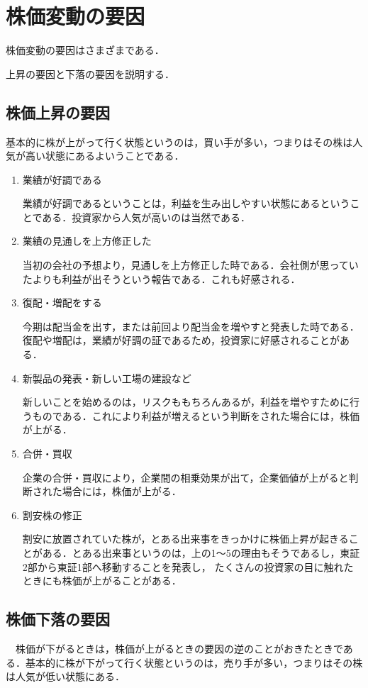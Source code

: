 \section{株価変動の要因}
株価変動の要因はさまざまである．

上昇の要因と下落の要因を説明する．

\subsection{株価上昇の要因}
基本的に株が上がって行く状態というのは，買い手が多い，つまりはその株は人気が高い状態にあるよいうことである．
\begin{enumerate}
  \item 業績が好調である

業績が好調であるということは，利益を生み出しやすい状態にあるということである．投資家から人気が高いのは当然である．
  \item 業績の見通しを上方修正した

当初の会社の予想より，見通しを上方修正した時である．会社側が思っていたよりも利益が出そうという報告である．これも好感される．
 \item 復配・増配をする

今期は配当金を出す，または前回より配当金を増やすと発表した時である．復配や増配は，業績が好調の証であるため，投資家に好感されることがある．
  \item 新製品の発表・新しい工場の建設など

新しいことを始めるのは，リスクももちろんあるが，利益を増やすために行うものである．これにより利益が増えるという判断をされた場合には，株価が上がる．
  \item 合併・買収

企業の合併・買収により，企業間の相乗効果が出て，企業価値が上がると判断された場合には，株価が上がる．
  \item 割安株の修正

割安に放置されていた株が，とある出来事をきっかけに株価上昇が起きることがある．とある出来事というのは，上の1～5の理由もそうであるし，東証2部から東証1部へ移動することを発表し，
たくさんの投資家の目に触れたときにも株価が上がることがある\cite{kabuup}．
\end{enumerate}

\subsection{株価下落の要因}
　株価が下がるときは，株価が上がるときの要因の逆のことがおきたときである．基本的に株が下がって行く状態というのは，売り手が多い，つまりはその株は人気が低い状態にある．

